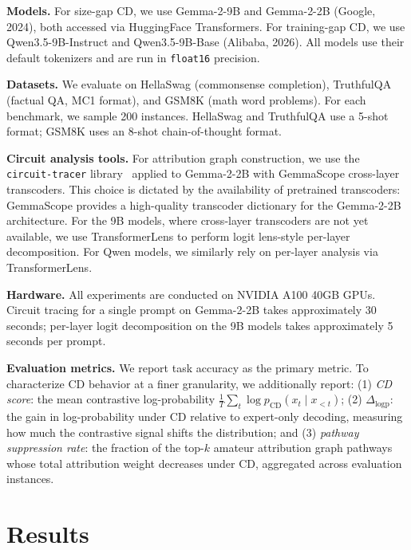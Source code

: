 \documentclass[11pt]{article}
\begin{document}
\textbf{Models.} For size-gap CD, we use Gemma-2-9B and Gemma-2-2B (Google, 2024), both accessed via HuggingFace Transformers. For training-gap CD, we use Qwen3.5-9B-Instruct and Qwen3.5-9B-Base (Alibaba, 2026). All models use their default tokenizers and are run in \texttt{float16} precision.

\textbf{Datasets.} We evaluate on HellaSwag (commonsense completion), TruthfulQA (factual QA, MC1 format), and GSM8K (math word problems). For each benchmark, we sample 200 instances. HellaSwag and TruthfulQA use a 5-shot format; GSM8K uses an 8-shot chain-of-thought format.

\textbf{Circuit analysis tools.} For attribution graph construction, we use the \texttt{circuit-tracer} library~\citep{anthropic2025attribution} applied to Gemma-2-2B with GemmaScope cross-layer transcoders. This choice is dictated by the availability of pretrained transcoders: GemmaScope provides a high-quality transcoder dictionary for the Gemma-2-2B architecture. For the 9B models, where cross-layer transcoders are not yet available, we use TransformerLens to perform logit lens-style per-layer decomposition. For Qwen models, we similarly rely on per-layer analysis via TransformerLens.

\textbf{Hardware.} All experiments are conducted on NVIDIA A100 40GB GPUs. Circuit tracing for a single prompt on Gemma-2-2B takes approximately 30 seconds; per-layer logit decomposition on the 9B models takes approximately 5 seconds per prompt.

\textbf{Evaluation metrics.} We report task accuracy as the primary metric. To characterize CD behavior at a finer granularity, we additionally report: (1) \emph{CD score}: the mean contrastive log-probability $\frac{1}{T}\sum_t \log p_{\text{CD}}(x_t \mid x_{<t})$; (2) \emph{$\Delta_{\text{logp}}$}: the gain in log-probability under CD relative to expert-only decoding, measuring how much the contrastive signal shifts the distribution; and (3) \emph{pathway suppression rate}: the fraction of the top-$k$ amateur attribution graph pathways whose total attribution weight decreases under CD, aggregated across evaluation instances.

\section{Results}
\label{sec:results}
\end{document}
